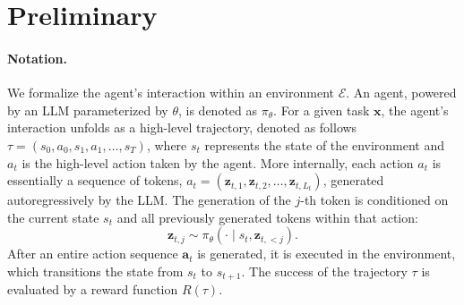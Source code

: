 \documentclass[]{fairmeta}
\begin{document}


\section{Preliminary}
\vspace{-0.5em}
\paragraph{Notation.}
We formalize the agent's interaction within an environment $\mathcal{E}$. An agent, powered by an LLM parameterized by $\theta$, is denoted as $\pi_\theta$. For a given task $\mathbf{x}$, the agent's interaction unfolds as a high-level trajectory, denoted as follows ${\tau} = ({s}_0, {a}_0, {s}_1,{a}_1, \ldots, {s}_T)$, 
where ${s}_t$ represents the state of the environment and $ {a}_t$ is the high-level action taken by the agent. 
More internally, each action $ {a}_t$ is essentially a sequence of tokens, $ {a}_t = (\mathbf{z}_{t,1}, \mathbf{z}_{t,2}, \ldots, \mathbf{z}_{t,L_t})$, generated autoregressively by the LLM. The generation of the $j$-th token is conditioned on the current state ${s}_t$ and all previously generated tokens within that action:
\begin{equation}
\mathbf{z}_{t,j} \sim \pi_\theta(\cdot \mid {s}_t, \mathbf{z}_{t,<j}).
\end{equation}
After an entire action sequence $\mathbf{a}_t$ is generated, it is executed in the environment, which transitions the state from ${s}_t$ to ${s}_{t+1}$. The success of the trajectory ${\tau}$ is evaluated by a reward function $R({\tau})$.


\vspace{-0.8em}
\end{document}
